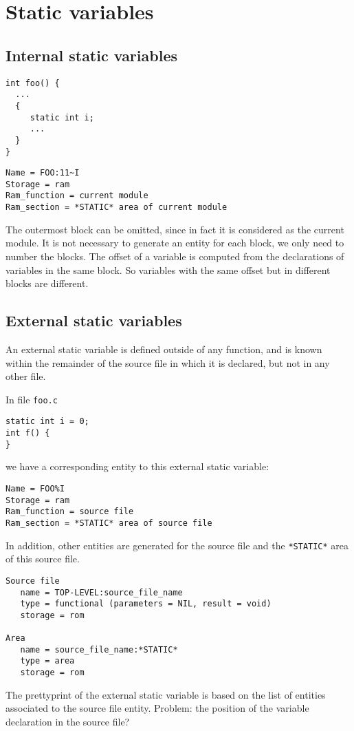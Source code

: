 \documentclass[a4paper]{report}
\begin{document}
\section{Static variables}

\subsection{Internal static variables}

\begin{lstlisting}
int foo() {
  ...
  {
     static int i;
     ...
  } 
}  
\end{lstlisting}

\begin{verbatim}
Name = FOO:11~I
Storage = ram 
Ram_function = current module
Ram_section = *STATIC* area of current module
\end{verbatim}
The outermost block can be omitted, since in fact it is considered as 
the current module. It is not necessary to generate an entity for each block, 
we only need to number the blocks. The offset of a variable is computed from 
the declarations of variables in the same block. So variables with the same
offset but in different blocks are different. 

\subsection{External static variables}

An external static variable is defined outside of any function, and is
known within the remainder of the source file in which it is declared, but
not in any other file. 

In file \texttt{foo.c}
\begin{lstlisting}
static int i = 0; 
int f() {
}
\end{lstlisting}
we have a corresponding entity to this external static variable:
\begin{verbatim}
Name = FOO%I
Storage = ram 
Ram_function = source file  
Ram_section = *STATIC* area of source file 
\end{verbatim}
In addition, other entities are generated for the source file and the 
\texttt{*STATIC*} area of this source file.
\begin{verbatim}
Source file
   name = TOP-LEVEL:source_file_name
   type = functional (parameters = NIL, result = void)
   storage = rom

Area
   name = source_file_name:*STATIC*
   type = area
   storage = rom
\end{verbatim}
 The prettyprint of the external static variable is based on the list of
entities associated to the source file entity. Problem: the position of the 
variable declaration in the source file? 
\end{document}
